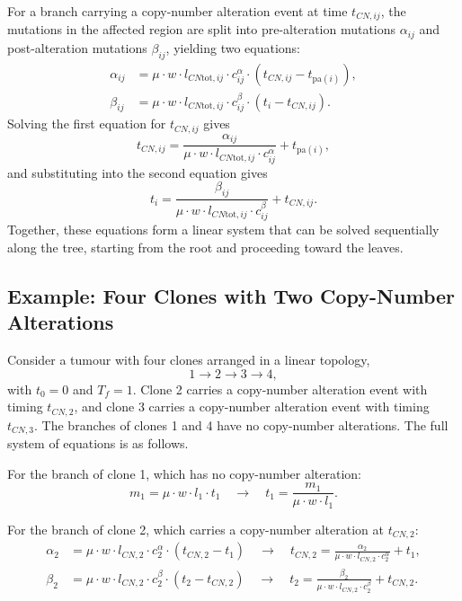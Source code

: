 For a branch carrying a copy-number alteration event at time $t_{CN,ij}$, the 
mutations in the affected region are split into pre-alteration mutations 
$\alpha_{ij}$ and post-alteration mutations $\beta_{ij}$, yielding two equations:
%
\begin{align}
    \alpha_{ij} &= \mu \cdot w \cdot l_{CN\mathrm{tot},ij} \cdot c^\alpha_{ij} 
    \cdot (t_{CN,ij} - t_{\mathrm{pa}(i)}), \\[4pt]
    \beta_{ij} &= \mu \cdot w \cdot l_{CN\mathrm{tot},ij} \cdot c^\beta_{ij} 
    \cdot (t_i - t_{CN,ij}).
\end{align}
%
Solving the first equation for $t_{CN,ij}$ gives
%
\begin{equation}
    t_{CN,ij} = \frac{\alpha_{ij}}{\mu \cdot w \cdot l_{CN\mathrm{tot},ij} 
    \cdot c^\alpha_{ij}} + t_{\mathrm{pa}(i)},
\end{equation}
%
and substituting into the second equation gives
%
\begin{equation}
    t_i = \frac{\beta_{ij}}{\mu \cdot w \cdot l_{CN\mathrm{tot},ij} 
    \cdot c^\beta_{ij}} + t_{CN,ij}.
\end{equation}
%
Together, these equations form a linear system that can be solved sequentially 
along the tree, starting from the root and proceeding toward the leaves.

\subsection*{Example: Four Clones with Two Copy-Number Alterations}

Consider a tumour with four clones arranged in a linear topology,
%
\begin{equation}
    1 \longrightarrow 2 \longrightarrow 3 \longrightarrow 4,
\end{equation}
%
with $t_0 = 0$ and $T_f = 1$. Clone 2 carries a copy-number alteration event with 
timing $t_{CN,2}$, and clone 3 carries a copy-number alteration event with timing 
$t_{CN,3}$. The branches of clones 1 and 4 have no copy-number alterations. The 
full system of equations is as follows.

For the branch of clone 1, which has no copy-number alteration:
%
\begin{equation}
    m_1 = \mu \cdot w \cdot l_1 \cdot t_1 
    \quad \longrightarrow \quad 
    t_1 = \frac{m_1}{\mu \cdot w \cdot l_1}.
\end{equation}

For the branch of clone 2, which carries a copy-number alteration at $t_{CN,2}$:
%
\begin{align}
    \alpha_2 &= \mu \cdot w \cdot l_{CN,2} \cdot c^\alpha_2 
    \cdot (t_{CN,2} - t_1)
    \quad \longrightarrow \quad
    t_{CN,2} = \frac{\alpha_2}{\mu \cdot w \cdot l_{CN,2} \cdot c^\alpha_2} + t_1, 
    \\[4pt]
    \beta_2 &= \mu \cdot w \cdot l_{CN,2} \cdot c^\beta_2 
    \cdot (t_2 - t_{CN,2})
    \quad \longrightarrow \quad
    t_2 = \frac{\beta_2}{\mu \cdot w \cdot l_{CN,2} \cdot c^\beta_2} + t_{CN,2}.
\end{align}

